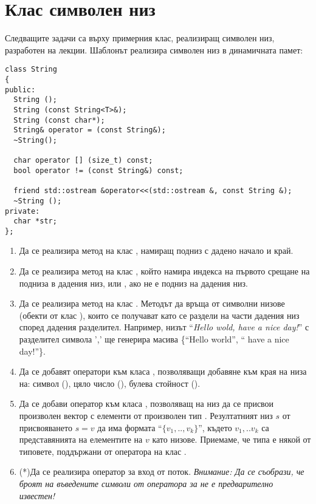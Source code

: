 \pagebreak

\clearpage\section{Клас символен низ}\label{sect:String}

\begin{mdframed}[hidealllines=true,backgroundcolor=gray!20]
Следващите задачи са върху примерния клас, реализиращ символен низ, разработен на лекции. Шаблонът реализира символен низ в динамичната памет:
\begin{verbatim}
class String
{
public:
  String ();
  String (const String<T>&);
  String (const char*);
  String& operator = (const String&);
  ~String();

  char operator [] (size_t) const;
  bool operator != (const String&) const;

  friend std::ostream &operator<<(std::ostream &, const String &);
  ~String ();
private:
  char *str;
};

\end{verbatim}
\end{mdframed}

\begin{enumerate}
  \item Да се реализира метод  на клас , намиращ подниз с дадено начало и край.
  \item Да се реализира метод  на клас , който намира индекса на първото срещане на подниза  в дадения низ, или , ако  не е подниз на дадения низ.
  \item Да се реализира метод  на клас . Методът да връща  от символни низове (обекти от клас ), които се получават като се раздели на части дадения низ според дадения разделител. Например, низът ``\emph{Hello wold, have a nice day!}'' с разделител символа ',' ще генерира масива \{``Hello world'', `` have a nice day!''\}.
  \item Да се добавят оператори \code{+=} към класа , позволяващи добавяне към края на низа на: символ (), цяло число (), булева стойност ().
  \item Да се добави оператор \code{=} към класа , позволяващ на низ да се присвои произволен вектор с елементи от произволен тип . Резултатният низ $s$ от присвояването $s=v$ да има формата ``$\{v_1,..,v_k\}$'', където $v_1,..v_k$ са представянията на елементите на $v$ като низове. Приемаме, че типа  е някой от типовете, поддържани от оператора \code{+=} на клас .
  \item (*)Да се реализира оператор за вход от поток. \emph{Внимание: Да се съобрази, че броят на въведените символи от оператора  \code{>{}>} за  не е предварително известен!}

\end{enumerate}


